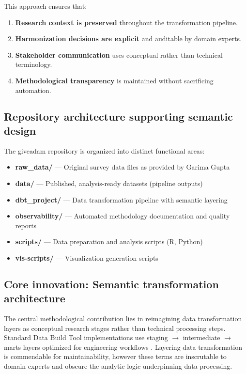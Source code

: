 \documentclass{article}
\begin{document}
This approach ensures that:

\begin{enumerate}
    \item \textbf{Research context is preserved} throughout the transformation pipeline.
    \item \textbf{Harmonization decisions are explicit} and auditable by domain experts.
    \item \textbf{Stakeholder communication} uses conceptual rather than technical terminology.
    \item \textbf{Methodological transparency} is maintained without sacrificing automation.
\end{enumerate}

\subsection{Repository architecture supporting semantic design}
\label{sec:repository-arch}

The giveadam repository is organized into distinct functional areas:

\begin{itemize}
    \item \textbf{raw\_data/} — Original survey data files as provided by Garima Gupta
    \item \textbf{data/} — Published, analysis-ready datasets (pipeline outputs)
    \item \textbf{dbt\_project/} — Data transformation pipeline with semantic layering
    \item \textbf{observability/} — Automated methodology documentation and quality reports
    \item \textbf{scripts/} — Data preparation and analysis scripts (R, Python)
    \item \textbf{vis-scripts/} — Visualization generation scripts
\end{itemize}

\subsection{Core innovation: Semantic transformation architecture}
\label{subsec:core-innovation}

The central methodological contribution lies in reimagining data transformation layers as conceptual research stages rather than technical processing steps. Standard Data Build Tool implementations use staging $\to$ intermediate $\to$ marts layers optimized for engineering workflows \cite{dbt_docs_structure}. Layering data transformation is commendable for maintainability, however these terms are inscrutable to domain experts and obscure the analytic logic underpinning data processing.
\end{document}
